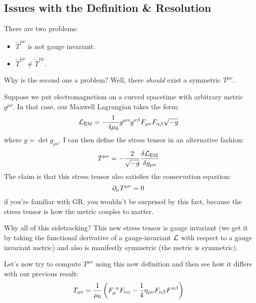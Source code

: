 \subsection{Issues with the Definition \& Resolution}
There are two problems:
\begin{itemize}
    \item $\tilde{T}^{\mu\nu}$ is not gauge invariant.
    \item $\tilde{T}^{\mu\nu} \neq \tilde{T}^{\nu\mu}$.
\end{itemize}
Why is the second one a problem? Well, there \emph{should} exist a symmetric $T^{\mu\nu}$. 

Suppose we put electromagnetism on a curved spacetime with arbitrary metric $g^{\mu\nu}$. In that case, our Maxwell Lagrangian takes the form:
\begin{equation}
    \mathcal{L}_{\text{EM}} = -\frac{1}{4\mu_0}g^{\mu\alpha}g^{\nu\beta}F_{\mu\nu}F_{\alpha\beta}\sqrt{-g}
\end{equation}
where $g = \det g_{\mu\nu}$. I can then define the stress tensor in an alternative fashion:
\begin{equation}
    T^{\mu\nu} = -\frac{2}{\sqrt{-g}}\frac{\delta \mathcal{L}_{\text{EM}}}{\delta g_{\mu\nu}}
\end{equation}
The claim is that this stress tensor also satisfies the conservation equation:
\begin{equation}
    \partial_\mu T^{\mu\nu} = 0
\end{equation}
if you're familiar with GR, you wouldn't be surprised by this fact, because the stress tensor is how the metric couples to matter.

Why all of this sidetracking? This new stress tensor is gauge invariant (we get it by taking the functional derivative of a gauge-invariant $\mathcal{L}$ with respect to a gauge invariant metric) and also is manifestly symmetric (the metric is symmetric).

Let's now try to compute $T^{\mu\nu}$ using this new definition and then see how it differs with our previous result:
\begin{equation}
    T_{\mu\nu} = \frac{1}{\mu_0}\left(F_{\mu}^{\sp\alpha}F_{\nu\alpha} - \frac{1}{4}\eta_{\mu\nu}F_{\alpha\beta}F^{\alpha\beta}\right)
\end{equation}

